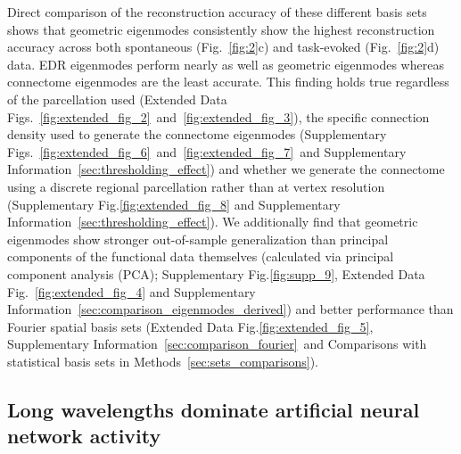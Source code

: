 \documentclass[sn-mathphys-num]{sn-jnl}%
\theoremstyle{thmstyleone}%
\theoremstyle{thmstyletwo}%
\theoremstyle{thmstylethree}%
\begin{document}
Direct comparison of the reconstruction accuracy of these different basis sets shows that geometric eigenmodes consistently show the highest reconstruction accuracy across both spontaneous (Fig.~\ref{fig:2}c) and task-evoked (Fig.~\ref{fig:2}d) data. 
EDR eigenmodes perform nearly as well as geometric eigenmodes whereas connectome eigenmodes are the least accurate. 
This finding holds true regardless of the parcellation used (Extended Data Figs.~\ref{fig:extended_fig_2}~and~\ref{fig:extended_fig_3}), the specific connection density used to generate the connectome eigenmodes (Supplementary Figs.~\ref{fig:extended_fig_6}~and~\ref{fig:extended_fig_7}~and Supplementary Information~\ref{sec:thresholding_effect}) and whether we generate the connectome using a discrete regional parcellation rather than at vertex resolution (Supplementary Fig.\ref{fig:extended_fig_8} and Supplementary Information~\ref{sec:thresholding_effect}). 
We additionally find that geometric eigenmodes show stronger out-of-sample generalization than principal components of the functional data themselves (calculated via principal component analysis (PCA); Supplementary Fig.\ref{fig:supp_9}, Extended Data Fig.~\ref{fig:extended_fig_4} and Supplementary Information~\ref{sec:comparison_eigenmodes_derived}) and better performance than Fourier spatial basis sets (Extended Data Fig.\ref{fig:extended_fig_5}, Supplementary Information~\ref{sec:comparison_fourier}~and Comparisons with statistical basis sets in Methods~\ref{sec:sets_comparisons}).

\subsection{Long wavelengths dominate artificial neural network activity}
\end{document}
